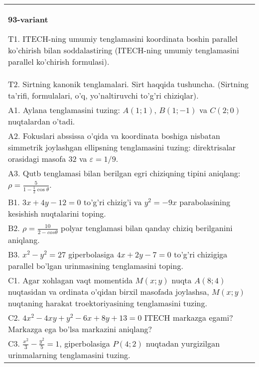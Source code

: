 \documentclass{article}
\begin{document}
\begin{tabular}{m{17cm}}
\textbf{93-variant}
\newline

T1. ITECH-ning umumiy tenglamasini koordinata boshin parallel ko'chirish bilan soddalastiring (ITECH-ning umumiy tenglamasini parallel ko'chirish formulasi).\\

T2. Sirtning kanonik tenglamalari. Sirt haqqida tushuncha. (Sirtning ta'rifi, formulalari, o'q, yo'naltiruvchi to'g'ri chiziqlar).\\

A1. Aylana tenglamasini tuzing: $A(1;1)$, $B(1;-1)$ va $C(2;0)$ nuqtalardan o'tadi.\\

A2. Fokuslari abssissa o'qida va koordinata boshiga nisbatan simmetrik joylashgan ellipsning tenglamasini tuzing: direktrisalar orasidagi masofa $32$ va $\varepsilon=1/9$.\\

A3. Qutb tenglamasi bilan berilgan egri chiziqning tipini aniqlang: $\rho=\frac{5}{1-\frac{1}{2}\cos\theta}$.\\

B1. $3x + 4y - 12 = 0$ to'g'ri chizig'i va $y^{2} = - 9x$ parabolasining kesishish nuqtalarini toping.\\

B2. $\rho = \frac{10}{2 - cos\theta}$ polyar tenglamasi bilan qanday chiziq berilganini aniqlang.  \\

B3. $x^{2} - y^{2} = 27$ giperbolasiga $4x + 2y - 7 = 0$ to'g'ri chizigiga parallel bo'lgan urinmasining tenglamasini toping.  \\

C1. Agar xohlagan vaqt momentida $M(x;y)$ nuqta $A(8;4)$ nuqtasidan va ordinata o'qidan birxil masofada joylashsa, $M(x;y)$ nuqtaning harakat troektoriyasining tenglamasini tuzing.  \\

C2. $4x^{2} - 4xy + y^{2} - 6x + 8y + 13 = 0$ ITECH markazga egami? Markazga ega bo'lsa markazini aniqlang?  \\

C3. $\frac{x^{2}}{3} - \frac{y^{2}}{5} = 1$, giperbolasiga $P(4;2)$ nuqtadan yurgizilgan urinmalarning tenglamasini tuzing.  \\

\end{tabular}
\vspace{1cm}
\end{document}

